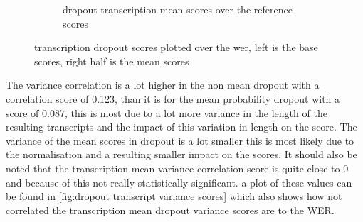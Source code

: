 \begin{figure}[ht]
\begin{subfigure}{0.4\linewidth}
        \caption{dropout transcription mean scores over the reference scores}
    \end{subfigure}
    \caption{transcription dropout scores plotted over the wer, left is the base scores, right half is the mean scores}
    \label{fig:dropout transcript scores}
    \end{figure}
    
The variance correlation is a lot higher in the non mean dropout with a correlation score of 0.123, than it is for the mean probability dropout with a score of 0.087, this is most due to a lot more variance in the length of the resulting transcripts and the impact of this variation in length on the score. The variance of the mean scores in dropout is a lot smaller this is most likely due to the normalisation and a resulting smaller impact on the scores. It should also be noted that the transcription mean variance correlation score is quite close to 0 and because of this not really statistically significant. a plot of these values can be found in \autoref{fig:dropout transcript variance scores} which also shows how not correlated the transcription mean dropout variance scores are to the WER. 
